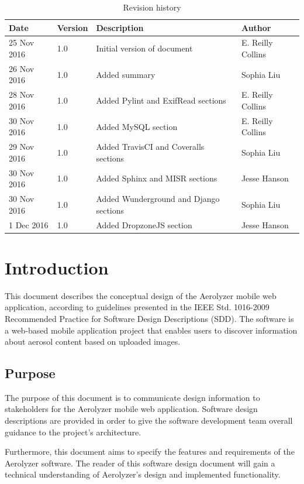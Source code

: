 \documentclass[onecolumn, draftclsnofoot,10pt, compsoc]{IEEEtran}
\begin{document}
\begin{flushleft}
\begin{table}[h!]
\caption{Revision history}\label{table:1}
\centering
\begin{tabular}{| p{2cm} | p{2cm} | p{5cm} | p{3cm} |}
\hline
\textbf{Date} & \textbf{Version} & \textbf{Description} & \textbf{Author} \\
\hline
25 Nov 2016 & 1.0 & Initial version of document & E. Reilly Collins\\
\hline
26 Nov 2016 & 1.0 & Added summary & Sophia Liu\\
\hline
28 Nov 2016 & 1.0 & Added Pylint and ExifRead sections & E. Reilly Collins\\
\hline
30 Nov 2016 & 1.0 & Added MySQL section & E. Reilly Collins\\
\hline
29 Nov 2016 & 1.0 & Added TravisCI and Coveralls sections & Sophia Liu\\
\hline
30 Nov 2016 & 1.0 & Added Sphinx and MISR sections & Jesse Hanson\\
\hline
30 Nov 2016 & 1.0 & Added Wunderground and Django sections & Sophia Liu\\
\hline
1 Dec 2016 & 1.0 & Added DropzoneJS section & Jesse Hanson\\
\hline
\end{tabular}
\end{table}

\clearpage
\section{Introduction} 
This document describes the conceptual design of the Aerolyzer mobile web application, according to guidelines presented in the IEEE Std. 1016-2009 Recommended Practice for Software Design Descriptions (SDD). The software is a web-based mobile application project that enables users to discover information about aerosol content based on uploaded images.

\subsection{Purpose }
The purpose of this document is to communicate design information to stakeholders for the Aerolyzer mobile web application. Software design descriptions are provided in order to give the software development team overall guidance to the project’s architecture. 

\medskip

Furthermore, this document aims to specify the features and requirements of the Aerolyzer software. The reader of this software design document will gain a technical understanding of Aerolyzer's design and implemented functionality. 



\end{flushleft}
\end{document}
